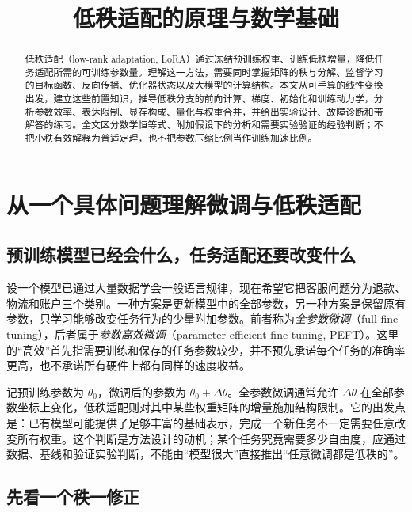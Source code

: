 \documentclass[UTF8,12pt,a4paper,fontset=fandol]{ctexart}
\title{低秩适配的原理与数学基础}
\author{}
\date{}
\begin{document}
\maketitle

\begin{abstract}
低秩适配（low-rank adaptation, LoRA）通过冻结预训练权重、训练低秩增量，降低任务适配所需的可训练参数量。理解这一方法，需要同时掌握矩阵的秩与分解、监督学习的目标函数、反向传播、优化器状态以及大模型的计算结构。本文从可手算的线性变换出发，建立这些前置知识，推导低秩分支的前向计算、梯度、初始化和训练动力学，分析参数效率、表达限制、显存构成、量化与权重合并，并给出实验设计、故障诊断和带解答的练习。全文区分数学恒等式、附加假设下的分析和需要实验验证的经验判断；不把小秩有效解释为普适定理，也不把参数压缩比例当作训练加速比例。
\end{abstract}

\tableofcontents

\section{从一个具体问题理解微调与低秩适配}
\label{sec:motivation}

\subsection{预训练模型已经会什么，任务适配还要改变什么}

设一个模型已通过大量数据学会一般语言规律，现在希望它把客服问题分为退款、物流和账户三个类别。一种方案是更新模型中的全部参数，另一种方案是保留原有参数，只学习能够改变任务行为的少量附加参数。前者称为\emph{全参数微调}（full fine-tuning），后者属于\emph{参数高效微调}（parameter-efficient fine-tuning, PEFT）。这里的“高效”首先指需要训练和保存的任务参数较少，并不预先承诺每个任务的准确率更高，也不承诺所有硬件上都有同样的速度收益。

记预训练参数为 $\theta_0$，微调后的参数为 $\theta_0+\Delta\theta$。全参数微调通常允许 $\Delta\theta$ 在全部参数坐标上变化，低秩适配则对其中某些权重矩阵的增量施加结构限制。它的出发点是：已有模型可能提供了足够丰富的基础表示，完成一个新任务不一定需要任意改变所有权重。这个判断是方法设计的动机；某个任务究竟需要多少自由度，应通过数据、基线和验证实验判断，不能由“模型很大”直接推出“任意微调都是低秩的”。

\subsection{先看一个秩一修正}
\end{document}
